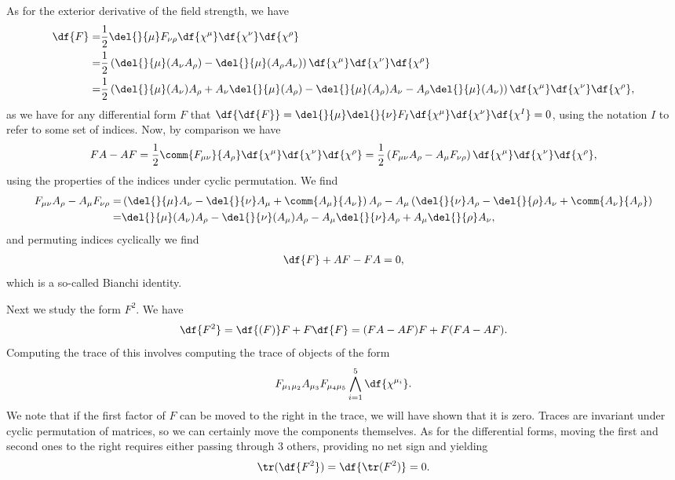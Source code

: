 As for the exterior derivative of the field strength, we have
\begin{align*}
	\df{F} =& \frac{1}{2}\del{}{\mu}F_{\nu\rho}\df{\chi^{\mu}}\df{\chi^{\nu}}\df{\chi^{\rho}} \\
	       =& \frac{1}{2}\left(\del{}{\mu}(A_{\nu}A_{\rho}) - \del{}{\mu}(A_{\rho}A_{\nu})\right)\df{\chi^{\mu}}\df{\chi^{\nu}}\df{\chi^{\rho}} \\
	       =& \frac{1}{2}\left(\del{}{\mu}(A_{\nu})A_{\rho} + A_{\nu}\del{}{\mu}(A_{\rho}) - \del{}{\mu}(A_{\rho})A_{\nu} - A_{\rho}\del{}{\mu}(A_{\nu})\right)\df{\chi^{\mu}}\df{\chi^{\nu}}\df{\chi^{\rho}},
\end{align*}
as we have for any differential form $F$ that $\df{\df{F}} = \del{}{\mu}\del{}{\nu}F_{I}\df{\chi^{\mu}}\df{\chi^{\nu}}\df{\chi^{I}} = 0$, using the notation $I$ to refer to some set of indices. Now, by comparison we have
\begin{align*}
	FA - AF = \frac{1}{2}\comm{F_{\mu\nu}}{A_{\rho}}\df{\chi^{\mu}}\df{\chi^{\nu}}\df{\chi^{\rho}} = \frac{1}{2}\left(F_{\mu\nu}A_{\rho} - A_{\mu}F_{\nu\rho}\right)\df{\chi^{\mu}}\df{\chi^{\nu}}\df{\chi^{\rho}},
\end{align*}
using the properties of the indices under cyclic permutation. We find
\begin{align*}
	F_{\mu\nu}A_{\rho} - A_{\mu}F_{\nu\rho} =& \left(\del{}{\mu}A_{\nu} - \del{}{\nu}A_{\mu} + \comm{A_{\mu}}{A_{\nu}}\right)A_{\rho} - A_{\mu}\left(\del{}{\nu}A_{\rho} - \del{}{\rho}A_{\nu} + \comm{A_{\nu}}{A_{\rho}}\right) \\
	                                        =& \del{}{\mu}(A_{\nu})A_{\rho} - \del{}{\nu}(A_{\mu})A_{\rho} - A_{\mu}\del{}{\nu}A_{\rho} + A_{\mu}\del{}{\rho}A_{\nu},
\end{align*}
and permuting indices cyclically we find
\begin{align*}
	\df{F} + AF - FA = 0,
\end{align*}
which is a so-called Bianchi identity.

Next we study the form $F^{2}$. We have
\begin{align*}
	\df{F^{2}} = \df{(F)}F + F\df{F} = (FA - AF)F + F(FA - AF).
\end{align*}
Computing the trace of this involves computing the trace of objects of the form
\begin{align*}
	F_{\mu_{1}\mu_{2}}A_{\mu_{3}}F_{\mu_{4}\mu_{5}}\bigwedge\limits_{i = 1}^{5}\df{\chi^{\mu_{i}}}.
\end{align*}
We note that if the first factor of $F$ can be moved to the right in the trace, we will have shown that it is zero. Traces are invariant under cyclic permutation of matrices, so we can certainly move the components themselves. As for the differential forms, moving the first and second ones to the right requires either passing through $3$ others, providing no net sign and yielding
\begin{align*}
	\tr(\df{F^{2}}) = \df{\tr(F^{2})} = 0.
\end{align*}

